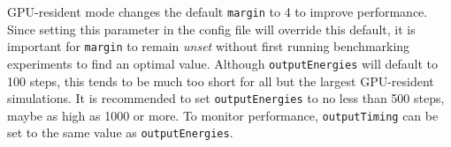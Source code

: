 GPU-resident mode changes the default \texttt{margin} to 4\;{\AA}
to improve performance.
Since setting this parameter in the config file will override
this default, it is important for \texttt{margin} to remain \emph{unset}
without first running benchmarking experiments to find an optimal value.
Although \texttt{outputEnergies} will default to 100 steps,
this tends to be much too short for all but the largest
GPU-resident simulations.
It is recommended to set \texttt{outputEnergies}
to no less than 500 steps, maybe as high as 1000 or more.
To monitor performance, \texttt{outputTiming}
can be set to the same value as \texttt{outputEnergies}.
